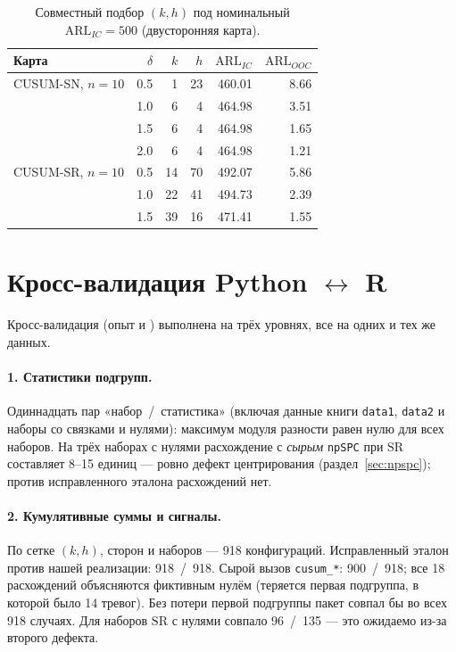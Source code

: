 \documentclass[11pt,a4paper]{article}
\newcommand{\SR}{\mathrm{SR}}
\newcommand{\ARL}{\mathrm{ARL}}
\begin{document}
\begin{table}[htbp]\centering
\caption{Совместный подбор $(k,h)$ под номинальный $\ARL_{IC}=500$
(двусторонняя карта).}
\label{tab:design}
\small
\begin{tabular}{@{}l r r r r r@{}}
\toprule
Карта & $\delta$ & $k$ & $h$ & $\ARL_{IC}$ & $\ARL_{OOC}$ \\
\midrule
CUSUM-SN, $n=10$ & 0.5 & 1  & 23 & 460.01 & 8.66 \\
                 & 1.0 & 6  & 4  & 464.98 & 3.51 \\
                 & 1.5 & 6  & 4  & 464.98 & 1.65 \\
                 & 2.0 & 6  & 4  & 464.98 & 1.21 \\
\addlinespace
CUSUM-SR, $n=10$ & 0.5 & 14 & 70 & 492.07 & 5.86 \\
                 & 1.0 & 22 & 41 & 494.73 & 2.39 \\
                 & 1.5 & 39 & 16 & 471.41 & 1.55 \\
\bottomrule
\end{tabular}
\normalsize
\end{table}


\section{Кросс-валидация Python $\leftrightarrow$ R}
\label{sec:cross}

Кросс-валидация (опыт  и
) выполнена на трёх уровнях, все на одних и тех же данных.

\paragraph{1. Статистики подгрупп.} Одиннадцать пар «набор~/~статистика»
(включая данные книги \texttt{data1}, \texttt{data2} и наборы со связками
и нулями): максимум модуля разности равен нулю для всех наборов.
На трёх наборах с нулями расхождение с \emph{сырым} \texttt{npSPC} при
$\SR$ составляет 8--15 единиц --- ровно дефект центрирования
(раздел~\ref{sec:npspc}); против исправленного эталона расхождений нет.

\paragraph{2. Кумулятивные суммы и сигналы.} По сетке $(k,h)$, сторон и
наборов --- 918 конфигураций. Исправленный эталон против нашей реализации:
918~/~918. Сырой вызов \texttt{cusum\_*}: 900~/~918; все 18 расхождений
объясняются фиктивным нулём (теряется первая подгруппа, в которой было 14
тревог). Без потери первой подгруппы пакет совпал бы во всех 918 случаях.
Для наборов $\SR$ с нулями совпало 96~/~135 --- это ожидаемо из-за второго
дефекта.
\end{document}
